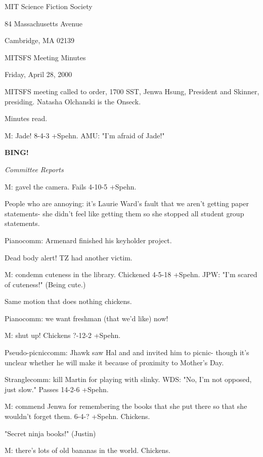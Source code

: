 \documentclass[12pt]{article}
\newcommand{\bing}{{\bf BING!} }
\newcommand{\goto}[1]{\bing \vskip 12pt \centerline{{\em{#1}}}}
\begin{document}
\begin{center}

MIT Science Fiction Society 

84 Massachusetts Avenue

Cambridge, MA 02139

\vspace{12pt}

MITSFS Meeting Minutes 

Friday, April 28, 2000

\end{center}
 
\vspace{18pt}

\setlength{\parskip}{6pt}

\noindent
MITSFS meeting called to order, 1700 SST, Jenwa Hsung, President and
Skinner, presiding.  Natasha Olchanski is the Onseck.

Minutes read.

M: Jade! 8-4-3 +Spehn. AMU: "I'm afraid of Jade!"

\goto{Committee Reports}

M: gavel the camera. Fails 4-10-5 +Spehn.

People who are annoying: it's Laurie Ward's fault that we aren't getting paper statements- she didn't feel like getting them so she stopped all student group statements.

Pianocomm: Armenard finished his keyholder project.

Dead body alert! TZ had another victim.

M: condemn cuteness in the library. Chickened 4-5-18 +Spehn. JPW: "I'm scared of cuteness!" (Being cute.)

Same motion that does nothing chickens.

Pianocomm: we want freshman (that we'd like) now!

M: shut up! Chickens ?-12-2 +Spehn.

Pseudo-picniccomm: Jhawk saw Hal and and invited him to picnic- though it's unclear whether he will make it because of proximity to Mother's Day.

Stranglecomm: kill Martin for playing with slinky. WDS: "No, I'm not opposed, just slow." Passes 14-2-6 +Spehn.

M: commend Jenwa for remembering the books that she put there so that she wouldn't forget them. 6-4-? +Spehn. Chickens.

"Secret ninja books!" (Justin)

M: there's lots of old bananas in the world. Chickens.
\end{document}

